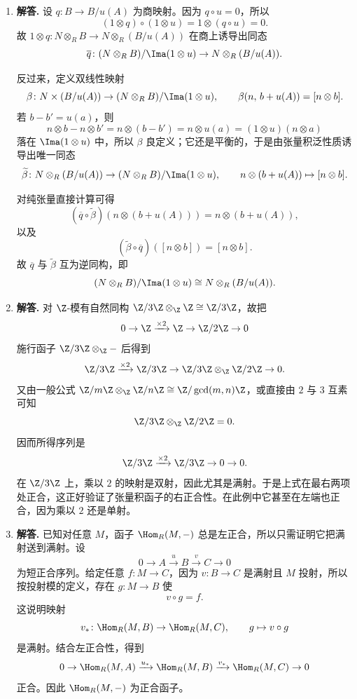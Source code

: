 \begin{enumerate}[label=\textbf{A.\arabic*.}, leftmargin=*, itemsep=1em]
  \item \textbf{解答.} 设 $q\colon B\to B/u(A)$ 为商映射。因为 $q\circ u=0$，所以
  \[
    (1\otimes q)\circ (1\otimes u)=1\otimes (q\circ u)=0.
  \]
  故 $1\otimes q\colon N\otimes_R B\to N\otimes_R(B/u(A))$ 在商上诱导出同态
  \[
    \overline q\colon (N\otimes_R B)/\Ima(1\otimes u)\to N\otimes_R(B/u(A)).
  \]

  反过来，定义双线性映射
  \[
    \beta\colon N\times (B/u(A))\to (N\otimes_R B)/\Ima(1\otimes u),
    \qquad \beta(n,\,b+u(A))=[n\otimes b].
  \]
  若 $b-b'=u(a)$，则
  \[
    n\otimes b-n\otimes b'=n\otimes (b-b')=n\otimes u(a)=(1\otimes u)(n\otimes a)
  \]
  落在 $\Ima(1\otimes u)$ 中，所以 $\beta$ 良定义；它还是平衡的，于是由张量积泛性质诱导出唯一同态
  \[
    \widetilde\beta\colon N\otimes_R(B/u(A))\to (N\otimes_R B)/\Ima(1\otimes u),
    \qquad n\otimes (b+u(A))\mapsto [n\otimes b].
  \]

  对纯张量直接计算可得
  \[
    (\overline q\circ \widetilde\beta)(n\otimes (b+u(A)))=n\otimes (b+u(A)),
  \]
  以及
  \[
    (\widetilde\beta\circ \overline q)([n\otimes b])=[n\otimes b].
  \]
  故 $\overline q$ 与 $\widetilde\beta$ 互为逆同构，即
  \[
    (N\otimes_R B)/\Ima(1\otimes u)\cong N\otimes_R(B/u(A)).
  \]

  \item \textbf{解答.} 对 $\Z$-模有自然同构 $\Z/3\Z\otimes_{\Z}\Z\cong \Z/3\Z$，故把
  \[
    0\to \Z \xrightarrow{\times 2} \Z \to \Z/2\Z \to 0
  \]
  施行函子 $\Z/3\Z\otimes_{\Z}-$ 后得到
  \[
    \Z/3\Z \xrightarrow{\times 2} \Z/3\Z \to \Z/3\Z\otimes_{\Z}\Z/2\Z \to 0.
  \]
  又由一般公式 $\Z/m\Z\otimes_{\Z}\Z/n\Z\cong \Z/\gcd(m,n)\Z$，或直接由 $2$ 与 $3$ 互素可知
  \[
    \Z/3\Z\otimes_{\Z}\Z/2\Z=0.
  \]
  因而所得序列是
  \[
    \Z/3\Z \xrightarrow{\times 2} \Z/3\Z \to 0 \to 0.
  \]
  在 $\Z/3\Z$ 上，乘以 $2$ 的映射是双射，因此尤其是满射。于是上式在最右两项处正合，这正好验证了张量积函子的右正合性。在此例中它甚至在左端也正合，因为乘以 $2$ 还是单射。

  \item \textbf{解答.} 已知对任意 $M$，函子 $\Hom_R(M,-)$ 总是左正合，所以只需证明它把满射送到满射。设
  \[
    0\to A\xrightarrow{u}B\xrightarrow{v}C\to 0
  \]
  为短正合序列。给定任意 $f\colon M\to C$，因为 $v\colon B\to C$ 是满射且 $M$ 投射，所以按投射模的定义，存在 $g\colon M\to B$ 使
  \[
    v\circ g=f.
  \]
  这说明映射
  \[
    v_*\colon \Hom_R(M,B)\to \Hom_R(M,C),
    \qquad g\mapsto v\circ g
  \]
  是满射。结合左正合性，得到
  \[
    0\to \Hom_R(M,A)\xrightarrow{u_*}\Hom_R(M,B)\xrightarrow{v_*}\Hom_R(M,C)\to 0
  \]
  正合。因此 $\Hom_R(M,-)$ 为正合函子。


\end{enumerate}
